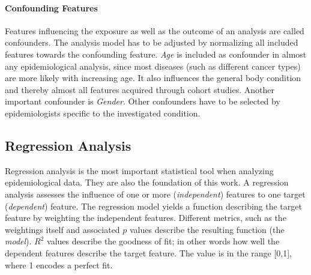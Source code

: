 \documentclass[journal]{style/vgtc} 			          %
\newcommand{\com}[1]{\textcolor{orange}{\uline{#1}}}
\begin{document}

\paragraph{Confounding Features}
Features influencing the exposure as well as the outcome of an analysis are called confounders.
The analysis model has to be adjusted by normalizing all included features towards the confounding feature.
\emph{Age} is included as confounder in almost any epidemiological analysis, since most diseases (such as different cancer types) are more likely with increasing age.
It also influences the general body condition and thereby almost all features acquired through cohort studies.
Another important confounder is \emph{Gender}.
Other confounders have to be selected by epidemiologists specific to the investigated condition.

\subsection{Regression Analysis} \label{sec:RegressionAnalysis}
Regression analysis is the most important statistical tool when analyzing epidemiological data.
They are also the foundation of this work.
A regression analysis assesses the influence of one or more (\emph{independent}) features to one target (\emph{dependent}) feature.
The regression model yields a function describing the target feature by weighting the independent features.
Different metrics, such as the weightings itself and associated $p$ values describe the resulting function (the \emph{model}).
$R^2$ values describe the goodness of fit; in other words how well the dependent features describe the target feature.
The value is in the range [0,1], where 1 encodes a perfect fit.
\end{document}
